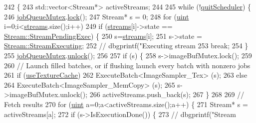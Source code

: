\begin{DoxyCode}
242 \{
243     std::vector<Stream*> activeStreams;
244 
245     \textcolor{keywordflow}{while} (!\hyperlink{class_queued_c_u_d_a_tracker_a277551e623212420a3c18dec6662c626}{quitScheduler}) \{
246         \hyperlink{class_queued_c_u_d_a_tracker_a57c66fb35caade90cadedd575d7b6c81}{jobQueueMutex}.\hyperlink{struct_threads_1_1_mutex_af3cb09072ecd935be502deb78f4519d5}{lock}();
247         Stream* s = 0;
248         \textcolor{keywordflow}{for} (\hyperlink{std__incl_8h_a91ad9478d81a7aaf2593e8d9c3d06a14}{uint} i=0;i<\hyperlink{class_queued_c_u_d_a_tracker_a06cc0da8192d0f8ff5d9edcad1158f58}{streams}.size();i++) 
249             \textcolor{keywordflow}{if} (\hyperlink{class_queued_c_u_d_a_tracker_a06cc0da8192d0f8ff5d9edcad1158f58}{streams}[i]->state == \hyperlink{struct_queued_c_u_d_a_tracker_1_1_stream_a836e14e096ea57bd153e812ce1e0a1f2a871a26b9ee42c5b70b5d3d90b8fc35c4}{Stream::StreamPendingExec}) \{
250                 s=\hyperlink{class_queued_c_u_d_a_tracker_a06cc0da8192d0f8ff5d9edcad1158f58}{streams}[i];
251                 s->state = \hyperlink{struct_queued_c_u_d_a_tracker_1_1_stream_a836e14e096ea57bd153e812ce1e0a1f2a62c88c473a98aed73b5fdf061753c63a}{Stream::StreamExecuting};
252         \textcolor{comment}{//      dbgprintf("Executing stream %
253                 \textcolor{keywordflow}{break};
254             \}
255         \hyperlink{class_queued_c_u_d_a_tracker_a57c66fb35caade90cadedd575d7b6c81}{jobQueueMutex}.\hyperlink{struct_threads_1_1_mutex_ad78fadce2239c6d359986e443822f6f6}{unlock}();
256 
257         \textcolor{keywordflow}{if} (s) \{
258             s->imageBufMutex.lock();
259 
260             \textcolor{comment}{// Launch filled batches, or if flushing launch every batch with nonzero jobs}
261             \textcolor{keywordflow}{if} (\hyperlink{class_queued_c_u_d_a_tracker_a1351abd5ca987de1b8663a919e511134}{useTextureCache})
262                 ExecuteBatch<ImageSampler\_Tex> (s);
263             \textcolor{keywordflow}{else}
264                 ExecuteBatch<ImageSampler\_MemCopy> (s);
265             s->imageBufMutex.unlock();
266             activeStreams.push\_back(s);
267         \}
268         
269         \textcolor{comment}{// Fetch results}
270         \textcolor{keywordflow}{for} (\hyperlink{std__incl_8h_a91ad9478d81a7aaf2593e8d9c3d06a14}{uint} a=0;a<activeStreams.size();a++) \{
271             Stream* s = activeStreams[a];
272             \textcolor{keywordflow}{if} (s->IsExecutionDone()) \{
273         \textcolor{comment}{//      dbgprintf("Stream %
}}
\end{DoxyCode}

